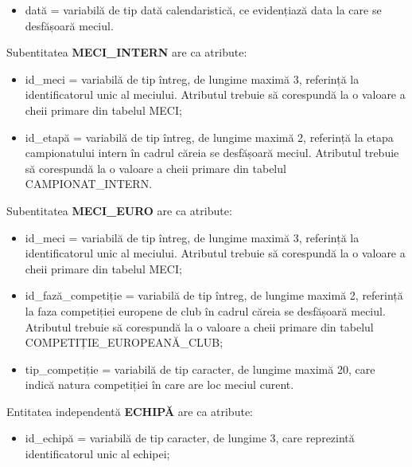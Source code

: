 \documentclass{article}
\begin{document}
\begin{spacing}{1.1}
\begin{itemize}
		\item dată = variabilă de tip dată calendaristică, ce evidențiază data la care se desfășoară meciul.
	\end{itemize}	
	
	\vspace{0.3cm}
	
	Subentitatea \textbf{MECI\_INTERN} are ca atribute:
	
	\begin{itemize}
		\item id\_meci = variabilă de tip întreg, de lungime maximă 3, referință la identificatorul unic al meciului. Atributul trebuie să corespundă la o valoare a cheii primare din tabelul MECI;
		
		\item id\_etapă = variabilă de tip întreg, de lungime maximă 2, referință la etapa campionatului intern în cadrul căreia se desfășoară meciul. Atributul trebuie să corespundă la o valoare a cheii primare din tabelul CAMPIONAT\_INTERN.
	\end{itemize}
	
	\vspace{0.3cm}
	
	Subentitatea \textbf{MECI\_EURO} are ca atribute:
	
	\begin{itemize}
		\item id\_meci = variabilă de tip întreg, de lungime maximă 3, referință la identificatorul unic al meciului. Atributul trebuie să corespundă la o valoare a cheii primare din tabelul MECI;
		
		\item id\_fază\_competiție = variabilă de tip întreg, de lungime maximă 2, referință la faza competiției europene de club în cadrul căreia se desfășoară meciul. Atributul trebuie să corespundă la o valoare a cheii primare din tabelul COMPETIȚIE\_EUROPEANĂ\_CLUB;
		
		\item tip\_competiție = variabilă de tip caracter, de lungime maximă 20, care indică natura competiției în care are loc meciul curent.
	\end{itemize}
	
	\vspace{0.3cm}
	
	Entitatea independentă \textbf{ECHIPĂ} are ca atribute:
	
	\begin{itemize}
		\item id\_echipă = variabilă de tip caracter, de lungime 3, care reprezintă identificatorul unic al echipei;
		

\end{itemize}
\end{spacing}
\end{document}
